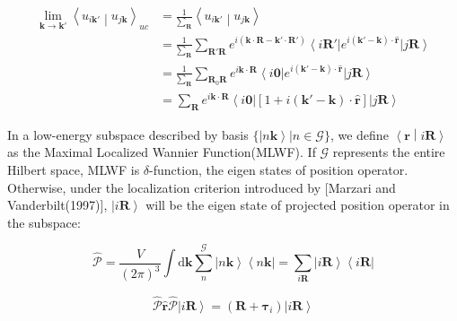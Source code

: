 \begin{equation}
  \begin{aligned}
    \lim_{\boldsymbol{k} \rightarrow \boldsymbol{k}'} \left\langle u_{i\boldsymbol{k}'} \middle| u_{j\boldsymbol{k}} \right\rangle_{uc} 
      &= \frac{1}{\sum_{\boldsymbol{R}}} \left\langle u_{i\boldsymbol{k}'} \middle| u_{j\boldsymbol{k}} \right\rangle \\
      &= \frac{1}{\sum_{\boldsymbol{R}}} \sum_{\boldsymbol{R}'\boldsymbol{R}} 
        e^{i\left( \boldsymbol{k} \cdot \boldsymbol{R} - \boldsymbol{k}' \cdot \boldsymbol{R}' \right)} 
        \left\langle i\boldsymbol{R}' \right| e^{i(\boldsymbol{k}'-\boldsymbol{k}) \cdot \hat{\boldsymbol{r}}} \left| j\boldsymbol{R} \right\rangle \\
      &= \frac{1}{\sum_{\boldsymbol{R}}} \sum_{\boldsymbol{R}_0\boldsymbol{R}} 
        e^{i\boldsymbol{k} \cdot \boldsymbol{R}} 
        \left\langle i\boldsymbol{0} \right| e^{i(\boldsymbol{k}'-\boldsymbol{k}) \cdot \hat{\boldsymbol{r}}} \left| j\boldsymbol{R} \right\rangle \\
      &= \sum_{\boldsymbol{R}} e^{i\boldsymbol{k} \cdot \boldsymbol{R}} 
        \left\langle i\boldsymbol{0} \right| \left[ 1 + i(\boldsymbol{k}'-\boldsymbol{k}) \cdot \hat{\boldsymbol{r}} \right] \left| j\boldsymbol{R} \right\rangle
  \end{aligned}
\end{equation}

\noindent
In a low-energy subspace described by basis $\{\left| n\boldsymbol{k} \right\rangle | n \in \mathcal{G}\}$, 
we define $\left\langle \boldsymbol{r} \middle| i\boldsymbol{R} \right\rangle$ as the Maximal Localized Wannier Function(MLWF).
If $\mathcal{G}$ represents the entire Hilbert space, MLWF is $\delta$-function, the eigen states of position operator.
Otherwise, under the localization criterion introduced by [Marzari and Vanderbilt(1997)], 
$\left| i\boldsymbol{R} \right\rangle$ will be the eigen state of projected position operator in the subspace:

\begin{equation}
  \hat{\mathcal{P}} 
  = \frac{V}{(2\pi)^3} \int \mathrm{d}\boldsymbol{k} \sum_{n}^{\mathcal{G}} \left| n\boldsymbol{k} \right\rangle \left\langle n\boldsymbol{k} \right| 
  = \sum_{i \boldsymbol{R}} \left| i\boldsymbol{R} \right\rangle \left\langle i\boldsymbol{R} \right| 
\end{equation}

\begin{equation}
  \hat{\mathcal{P}} \hat{\boldsymbol{r}} \hat{\mathcal{P}} \left| i\boldsymbol{R} \right\rangle 
    = \left( \boldsymbol{R} + \boldsymbol{\tau}_{i} \right) \left| i\boldsymbol{R} \right\rangle 
\end{equation}

